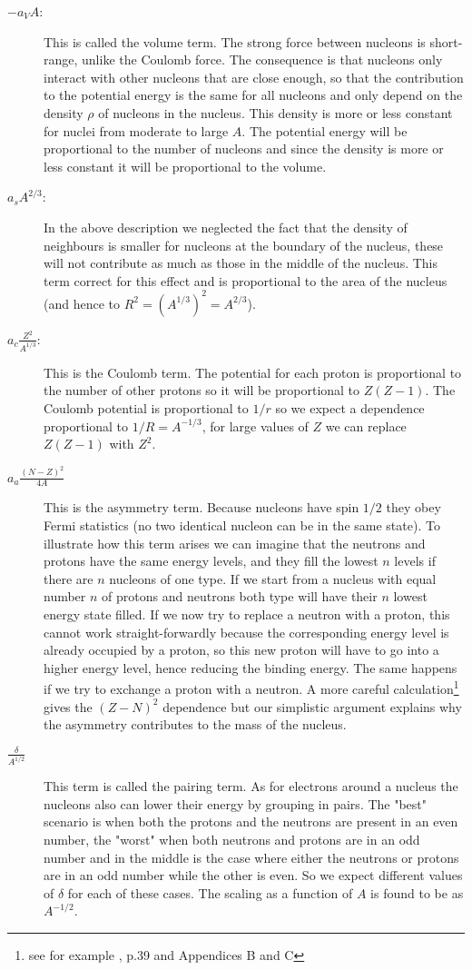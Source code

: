 \begin{description}
\item[$-a_V A$: ] This is called the volume term. The strong force between nucleons is short-range, unlike the Coulomb force. The consequence is that nucleons only interact with other nucleons that are close enough, so that the contribution to the potential energy is the same for all nucleons and only depend on the density $\rho$ of nucleons in the nucleus. This density is more or less constant for nuclei from moderate to large $A$. The potential energy will be proportional to the number of nucleons and since the density is more or less constant it will be proportional to the volume.   
\item[$a_sA^{2/3}$:] In the above description we neglected the fact that the density of neighbours is smaller for nucleons at the boundary of the nucleus, these will not contribute as much as those in the middle of the nucleus. This term correct for this effect and is proportional to the area of the nucleus (and hence to $R^2=(A^{1/3})^2=A^{2/3}$).
\item[$a_c\frac{Z^2}{A^{1/3}}$:] This is the Coulomb term. The potential for each proton is proportional to the number of other protons so it will be proportional to $Z(Z-1)$. The Coulomb potential is proportional to $1/r$ so we expect a dependence proportional to $1/R=A^{-1/3}$, for large values of $Z$ we can replace $Z(Z-1)$ with $Z^2$.
\item[$a_a\frac{(N-Z)^2}{4A}$] This is the asymmetry term. Because nucleons have spin $1/2$ they obey Fermi statistics (no two identical nucleon can be in the same state). To illustrate how this term arises we can imagine that the neutrons and protons have the same energy levels, and they fill the lowest $n$ levels if there are $n$ nucleons of one type. If we start from a nucleus with equal number $n$ of protons and neutrons both type will have their $n$ lowest energy state filled. If we now try to replace a neutron with a proton, this cannot work straight-forwardly because the corresponding energy level is already occupied by a proton, so this new proton will have to go into a higher energy level, hence reducing the binding energy. The same happens if we try to exchange a proton with a neutron. A more careful calculation\footnote{see for example \cite{Lilley:2009zz}, p.39 and Appendices B and C} gives the $(Z-N)^2$ dependence but our simplistic argument explains why the asymmetry contributes to the mass of the nucleus.    
\item[$\frac{\delta}{A^{1/2}}$] This term is called the pairing term. As for electrons around a nucleus the nucleons also can lower their energy by grouping in pairs. The "best" scenario is when both the protons and the neutrons are present in an even number, the "worst" when both neutrons and protons are in an odd number and in the middle is the case where either the neutrons or protons are in an odd number while the other is even. So we expect different values of $\delta$ for each of these cases. The scaling as a function of $A$ is found to be as $A^{-1/2}$.     

\end{description}
